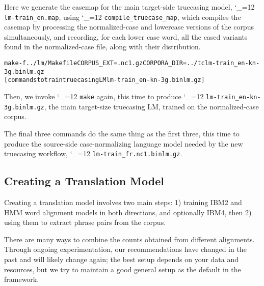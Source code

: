 \documentclass[11pt,letterpaper]{article}
\newcommand{\bs}{\textbackslash{}}
\def\code{\begingroup\catcode`\_=12 \codex}
\newcommand{\codex}[1]{\texttt{#1}\endgroup}
\begin{document}
Here we generate the casemap for the main target-side truecasing model,
\code{lm-train_en.map}, using \code{compile_truecase_map}, which compiles the
casemap by processing the normalized-case and lowercase versions of the corpus
simultaneously, and recording, for each lower case word, all the cased variants
found in the normalized-case file, along with their distribution.

\begin{small}
\begin{alltt}
   make -f ../lm/Makefile CORPUS_EXT=.nc1.gz CORPORA_DIR=../tc lm-train_en-kn-3g.binlm.gz
   [commands to train truecasing LM lm-train_en-kn-3g.binlm.gz]
\end{alltt}
\end{small}

Then, we invoke \code{make} again, this time to produce
\code{lm-train_en-kn-3g.binlm.gz}, the main target-size truecasing LM, trained on
the normalized-case corpus.


The final three commands do the same thing as the first three, this time to
produce the source-side case-normalizing language model needed by the new
truecasing workflow, \code{lm-train_fr.nc1.binlm.gz}.

\subsection{Creating a Translation Model} \label{TM}

Creating a translation model involves two main steps: 1) training IBM2 and HMM word
alignment models in both directions, and optionally IBM4, then 2) using them to
extract phrase pairs from the corpus.

There are many ways to combine the counts obtained from different alignments.
Through ongoing experimentation, our recommendations have changed in the past
and will likely change again; the best setup depends on your data and
resources, but we try to maintain a good general setup as the default in the
framework.
\end{document}
